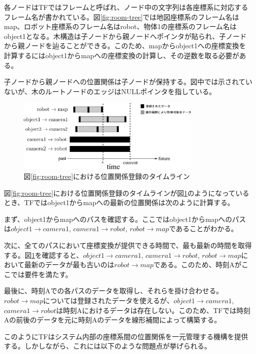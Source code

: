\documentclass{jarticle}
\begin{document}
\begin{multicols}{2}
各ノードはTFではフレームと呼ばれ、ノード中の文字列は各座標系に対応するフレーム名が書かれている。図\ref{fig:room-tree}では地図座標系のフレーム名はmap、ロボット座標系のフレーム名はrobot、物体1の座標系のフレーム名はobject1となる。木構造は子ノードから親ノードへポインタが貼られ、子ノードから親ノードを辿ることができる。このため、mapからobject1への座標変換を計算するにはobject1からmapへの座標変換の計算し、その逆数を取る必要がある。

子ノードから親ノードへの位置関係は子ノードが保持する。図中では示されていないが、木のルートノードのエッジはNULLポインタを指している。

\begin{figure} 
\centering
\includegraphics[width=0.8\textwidth]{room-timeline}	
\caption{図\ref{fig:room-tree}における位置関係登録のタイムライン}
\label{fig:room-timeline}
\end{figure}

図\ref{fig:room-tree}における位置関係登録のタイムラインが図\ref{fig:room-timeline}のようになっているとき、TFではobject1からmapへの最新の位置関係は次のように計算する。

まず、object1からmapへのパスを確認する。ここではobject1からmapへのパスは$object1 \rightarrow camera1$, $camera1 \rightarrow robot$, $robot \rightarrow map$であることがわかる。

次に、全てのパスにおいて座標変換が提供できる時間で、最も最新の時間を取得する。図\ref{fig:room-timeline}を確認すると、$object1 \rightarrow camera1$, $camera1 \rightarrow robot$, $robot \rightarrow map$において最新のデータが最も古いのは$robot \rightarrow map$である。このため、時刻Aがここでは要件を満たす。

最後に、時刻Aでの各パスのデータを取得し、それらを掛け合わせる。$robot \rightarrow map$については登録されたデータを使えるが、$object1 \rightarrow camera1$, $camera1 \rightarrow robot$は時刻Aにおけるデータは存在しない。このため、TFでは時刻Aの前後のデータを元に時刻Aのデータを線形補間によって構築する。

このようにTFはシステム内部の座標系間の位置関係を一元管理する機構を提供する。しかしながら、これには以下のような問題点が挙げられる。


\end{multicols}
\end{document}
